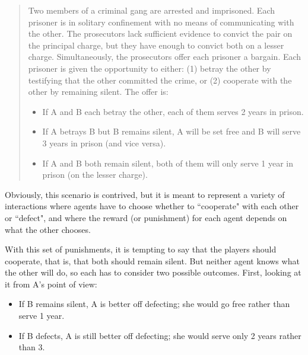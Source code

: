 \documentclass[12pt]{book}
\theoremstyle{exercise}
\begin{document}

\begin{quote}
Two members of a criminal gang are arrested and imprisoned. Each prisoner is in solitary confinement with no means of communicating with the other. The prosecutors lack sufficient evidence to convict the pair on the principal charge, but they have enough to convict both on a lesser charge. Simultaneously, the prosecutors offer each prisoner a bargain. Each prisoner is given the opportunity to either: (1) betray the other by testifying that the other committed the crime, or (2) cooperate with the other by remaining silent. The offer is:

\begin{itemize}

\item If A and B each betray the other, each of them serves 2 years in prison.

\item If A betrays B but B remains silent, A will be set free and B will serve 3 years in prison (and vice versa).

\item If A and B both remain silent, both of them will only serve 1 year in prison (on the lesser charge).

\end{itemize}

\end{quote}

Obviously, this scenario is contrived, but it is meant to represent a variety of interactions where agents have to choose whether to ``cooperate" with each other or ``defect", and where the reward (or punishment) for each agent depends on what the other chooses.


With this set of punishments, it is tempting to say that the players should cooperate, that is, that both should remain silent.  But neither agent knows what the other will do, so each has to consider two possible outcomes.  First, looking at it from A's point of view:

\begin{itemize}

\item If B remains silent, A is better off defecting; she would go free rather than serve 1 year.

\item If B defects, A is still better off defecting; she would serve only 2 years rather than 3.

\end{itemize}
\end{document}
